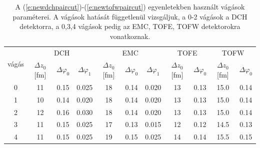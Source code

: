 \documentclass[11pt,a4paper]{article}
\numberwithin{equation}{subsection}
\numberwithin{figure}{section}
\begin{document}
\begin{table}[H]
\begin{center}
\begin{tabular}{|c||c|c|c||c|c|c||c|c||c|c|}\hline
\multirow{2}{*}{\small{vágás}} 
& \multicolumn{3}{c||}{DCH}
& \multicolumn{3}{c||}{EMC}
& \multicolumn{2}{c||}{TOFE}
& \multicolumn{2}{c|}{TOFW}\\
  & $\Delta z_0$ [fm] & $\Delta \varphi_0$ & $\Delta \varphi_1$ 
  & $\Delta z_0$ [fm] & $\Delta \varphi_0$ & $\Delta \varphi_1$
  & $\Delta z_0$ [fm] & $\Delta \varphi_0$
  & $\Delta z_0$ [fm] & $\Delta \varphi_0$\\\hline\hline
0 & 11 & 0.15 & 0.025 & 18 & 0.14 & 0.020 & 13 & 0.13 & 15.0 & 0.14\\\hline
1 & 10 & 0.14 & 0.020 & 18 & 0.14 & 0.020 & 13 & 0.13 & 15.0 & 0.14\\\hline
2 & 12 & 0.16 & 0.030 & 18 & 0.14 & 0.020 & 13 & 0.13 & 15.0 & 0.14\\\hline
3 & 11 & 0.15 & 0.025 & 17 & 0.13 & 0.015 & 12 & 0.12 & 14.5 & 0.13\\\hline
4 & 11 & 0.15 & 0.025 & 19 & 0.15 & 0.025 & 14 & 0.14 & 15.5 & 0.15\\\hline

\end{tabular}
\end{center}
\caption{A (\ref{e:newdchpaircut})-(\ref{e:newtofwpaircut}) egyenletekben használt vágások paraméterei. A vágások hatását függetlenül vizsgáljuk, a 0-2 vágások a DCH detektorra, a 0,3,4 vágások pedig az EMC, TOFE, TOFW detektorokra vonatkoznak.}
\label{tab:paircuts}
\end{table}
\end{document}
